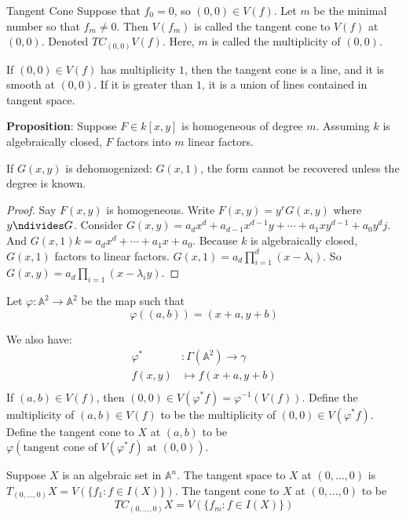 \documentclass{report}
\begin{document}
\begin{definition}{Tangent Cone}
    Suppose that $f_{0} = 0$, so $(0, 0) \in V(f)$. Let $m$ be the minimal number so that $f_{m} \neq 0$. Then $V(f_{m})$ is called the tangent cone to $V(f)$ at $(0, 0)$. Denoted $TC_{(0, 0)}V(f)$. Here, $m$ is called the multiplicity of $(0, 0)$.
\end{definition}

If $(0, 0) \in V(f)$ has multiplicity $1$, then the tangent cone is a line, and it is smooth at $(0, 0)$. If it is greater than $1$, it is a union of lines contained in tangent space.

\textbf{Proposition}: Suppose $F \in k[x, y]$ is homogeneous of degree $m$. Assuming $k$ is algebraically closed, $F$ factors into $m$ linear factors.

If $G(x, y)$ is dehomogenized: $G(x, 1)$, the form cannot be recovered unless the degree is known.
    \begin{proof}
        Say $F(x, y)$ is homogeneous. Write $F(x, y) = y^{r}G(x, y)$ where $y \ndivides G$. Consider $G(x, y) = a_{d}x^{d} + a_{d - 1}x^{d - 1}y + \cdots +a_{1}xy^{d - 1} + a_{0}y^{d}j$. And $G(x, 1)k= a_{d}x^{d} + \cdots  + a_{1}x + a_{0}$. Because $k$ is algebraically closed, $G(x, 1)$ factors to linear factors. $G(x, 1) = a_{d} \prod_{i = 1}^{d} (x - \lambda_{i})$. So $G(x, y) = a_{d} \prod_{i = 1}^{} (x - \lambda_{i}y)$.
    \end{proof}

Let $\varphi : \mathbb{A}^{2} \rightarrow \mathbb{A}^{2}$ be the map such that 
    \begin{equation*}
        \varphi((a, b)) = (x + a, y + b)
    \end{equation*}

We also have:
    \begin{align*}
        \varphi^{*} &: \Gamma(\mathbb{A}^{2}) \rightarrow \gamma          \\
        f(x, y)               &\mapsto  f(x + a, y + b)  \\
    \end{align*}
If $(a, b) \in V(f)$, then $(0, 0) \in V(\varphi^{*}f) = \varphi^{-1}(V(f))$. Define the multiplicity of $(a, b) \in V(f)$ to be the multiplicity of $(0, 0) \in V(\varphi^{*}f)$. Define the tangent cone to $X$ at $(a, b)$ to be $\varphi(\text{tangent cone of $V(\varphi^{*}f)$ at $(0, 0)$})$.

Suppose $X$ is an algebraic set in $\mathbb{A}^{n}$. The tangent space to $X$ at $(0, \ldots , 0)$ is $T_{(0, \ldots , 0)}X = V(\{f_{1} : f \in I(X)\})$. The tangent cone to $X$ at $(0, \ldots , 0)$ to be 
    \begin{equation*}
        TC_{(0, \ldots , 0)}X = V(\{f_{m} :  f\in I(X)\})
    \end{equation*}
\end{document}
